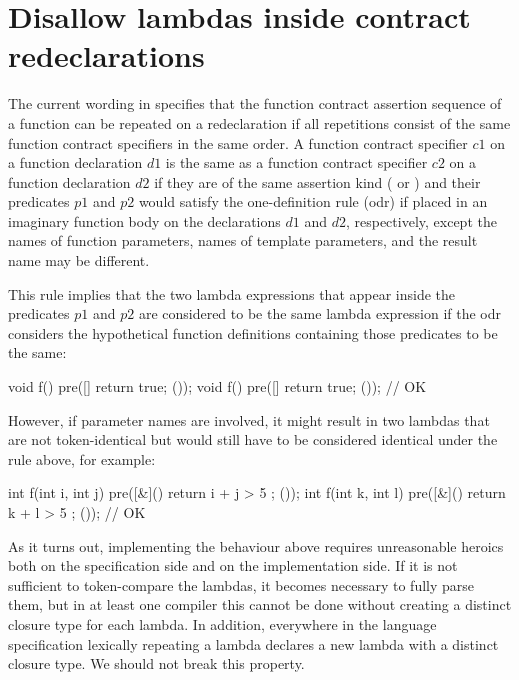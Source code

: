 \pagebreak

\section{Disallow lambdas inside contract redeclarations}

The current wording in \cite{P2900R11} specifies that the function contract assertion sequence of a function can be repeated on a redeclaration if all repetitions consist of the same function contract
specifiers in the same order. A function contract specifier $c1$ on a function declaration $d1$ is  the same as a function contract specifier $c2$ on a function declaration $d2$ if they are of the same assertion kind ( or ) and  their predicates $p1$ and $p2$ would
satisfy the one-definition rule (odr) if placed in an imaginary function body on the declarations $d1$
and $d2$, respectively, except the names of function parameters, names of template parameters, and the result name may be different.

This rule implies that the two lambda expressions that appear inside the predicates $p1$ and $p2$ are considered to be the same lambda expression if the odr considers the hypothetical function
definitions containing those predicates to be the same:

\begin{codeblock}
void f() pre([]{ return true; }());
void f() pre([]{ return true; }());  // OK
\end{codeblock}

However, if parameter names are involved, it might result in two lambdas that are not token-identical but would still have to be considered identical under the rule above, for example:

\begin{codeblock}
int f(int i, int j) pre([&](){ return i + j > 5 ; }());
int f(int k, int l) pre([&](){ return k + l > 5 ; }());  // OK
\end{codeblock}

As it turns out, implementing the behaviour above requires unreasonable heroics both on the specification side and on the implementation side. If it is not sufficient to token-compare the lambdas, it becomes necessary to fully parse them, but in at least one compiler this cannot be done without creating a distinct closure type for each lambda. In addition, everywhere in the language specification lexically repeating a lambda declares a new lambda with a distinct closure type. We should not break this property.

